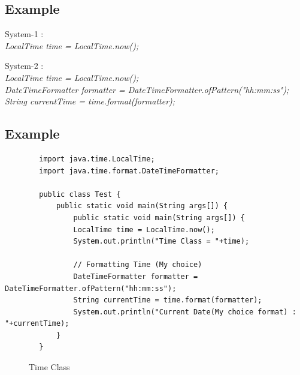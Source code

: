 \documentclass[openany]{book}  %
\begin{document}
\subsection{Example}
\begin{center}
    \tt{
        \raggedright{System-1 :}\\
        \textit{
            LocalTime time = LocalTime.now();\\
        }
        \vskip 0.5cm
        \raggedright{System-2 :}\\
        \textit{
            LocalTime time = LocalTime.now();\\
            DateTimeFormatter formatter = DateTimeFormatter.ofPattern("hh:mm:ss");\\
            String currentTime = time.format(formatter);\\
        }
    }
\end{center}

\newpage

% 
% 
\subsection{Example}
\begin{center}
    \footnotesize
    \begin{verbatim}
        import java.time.LocalTime;
        import java.time.format.DateTimeFormatter;

        public class Test {
            public static void main(String args[]) {
                public static void main(String args[]) {
                LocalTime time = LocalTime.now();
                System.out.println("Time Class = "+time);

                // Formatting Time (My choice)
                DateTimeFormatter formatter = DateTimeFormatter.ofPattern("hh:mm:ss");
                String currentTime = time.format(formatter);
                System.out.println("Current Date(My choice format) : "+currentTime);
            }
        }
    \end{verbatim}
\end{center}
% 
% 
\begin{figure}[htbp]
    \begin{center}
        \caption{Time Class}
    \end{center}
\end{figure}
% 
% 
\end{document}
